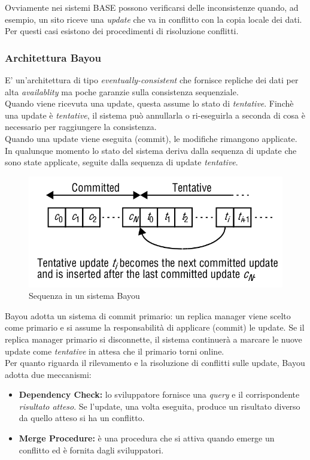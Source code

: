 \documentclass{article}
\begin{document}
Ovviamente nei sistemi BASE possono verificarsi delle inconsistenze quando, ad esempio, un sito riceve una \textit{update} che va in conflitto con la copia locale dei dati. Per questi casi esistono dei procedimenti di risoluzione conflitti.

\subsubsection{Architettura Bayou}
E' un'architettura di tipo \textit{eventually-consistent} che fornisce repliche dei dati per alta \textit{availablity} ma poche garanzie sulla consistenza sequenziale.\\
Quando viene ricevuta una update, questa assume lo stato di \textit{tentative}. Finchè una update è \textit{tentative}, il sistema può annullarla o ri-eseguirla a seconda di cosa è necessario per raggiungere la consistenza.\\
Quando una update viene eseguita (commit), le modifiche rimangono applicate. In qualunque momento lo stato del sistema deriva dalla sequenza di update che sono state applicate, seguite dalla sequenza di update \textit{tentative}.
\begin{figure}[H]
    \centering
    \includegraphics[scale=0.4]{img/bayou.png}
    \caption{Sequenza in un sistema Bayou}
\end{figure}\noindent
Bayou adotta un sistema di commit primario: un replica manager viene scelto come primario e si assume la responsabilità di applicare (commit) le update. Se il replica manager primario si disconnette, il sistema continuerà a marcare le nuove update come \textit{tentative} in attesa che il primario torni online.\\
Per quanto riguarda il rilevamento e la risoluzione di conflitti sulle update, Bayou adotta due meccanismi:
\begin{itemize}
    \item \textbf{Dependency Check:} lo sviluppatore fornisce una \textit{query} e il corrispondente \textit{risultato atteso}. Se l'update, una volta eseguita, produce un risultato diverso da quello atteso si ha un conflitto.
    \item \textbf{Merge Procedure:} è una procedura che si attiva quando emerge un conflitto ed è fornita dagli sviluppatori.
\end{itemize}
\end{document}
